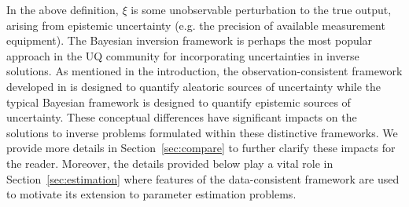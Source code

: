 In the above definition, $\xi$ is some unobservable perturbation to the true output, arising from epistemic uncertainty (e.g. the precision of available measurement equipment).
The Bayesian inversion framework  is perhaps the most popular approach in the UQ community for incorporating uncertainties in inverse solutions.
As mentioned in the introduction, the observation-consistent framework developed in \cite{BJW18a, BJW18b, BWY20} is designed to quantify aleatoric sources of uncertainty while the typical Bayesian framework \cite{0266-5611-7-5-003,
 Kennedy_O_JRSSSB_2001,Tarantola_book, MNR07, CDS10,starktenorio,
 AlexanderianPetraStadlerEtAl14, Bui-ThanhGhattas14, Ernst2014,
 0266-5611-30-11-110301, ROM:CMW_2016,Stuart10,
 cockayneoatessullivangirolami} is designed to quantify epistemic sources of uncertainty.
These conceptual differences have significant impacts on the solutions to inverse problems formulated within these distinctive frameworks.
We provide more details in Section~\ref{sec:compare} to further clarify these impacts for the reader.
Moreover, the details provided below play a vital role in Section~\ref{sec:estimation} where features of the data-consistent framework are used to motivate its extension to parameter estimation problems.

\FloatBarrier
